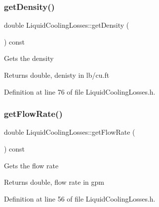 \subsubsection{\texorpdfstring{get\+Density()}{getDensity()}\hspace{0.1cm}{\footnotesize\ttfamily [3/3]}}
{\footnotesize\ttfamily double Liquid\+Cooling\+Losses\+::get\+Density (\begin{DoxyParamCaption}{ }\end{DoxyParamCaption}) const\hspace{0.3cm}{\ttfamily [inline]}}

Gets the density

\begin{DoxyReturn}{Returns}
double, denisty in lb/cu.\+ft 
\end{DoxyReturn}


Definition at line 76 of file Liquid\+Cooling\+Losses.\+h.

\mbox{\label{class_liquid_cooling_losses_acb4a68199bdc5f0597d1feadc3ecdb2c}} 
\subsubsection{\texorpdfstring{get\+Flow\+Rate()}{getFlowRate()}\hspace{0.1cm}{\footnotesize\ttfamily [1/3]}}
{\footnotesize\ttfamily double Liquid\+Cooling\+Losses\+::get\+Flow\+Rate (\begin{DoxyParamCaption}{ }\end{DoxyParamCaption}) const\hspace{0.3cm}{\ttfamily [inline]}}

Gets the flow rate

\begin{DoxyReturn}{Returns}
double, flow rate in gpm 
\end{DoxyReturn}


Definition at line 56 of file Liquid\+Cooling\+Losses.\+h.

\mbox{\label{class_liquid_cooling_losses_acb4a68199bdc5f0597d1feadc3ecdb2c}} 
